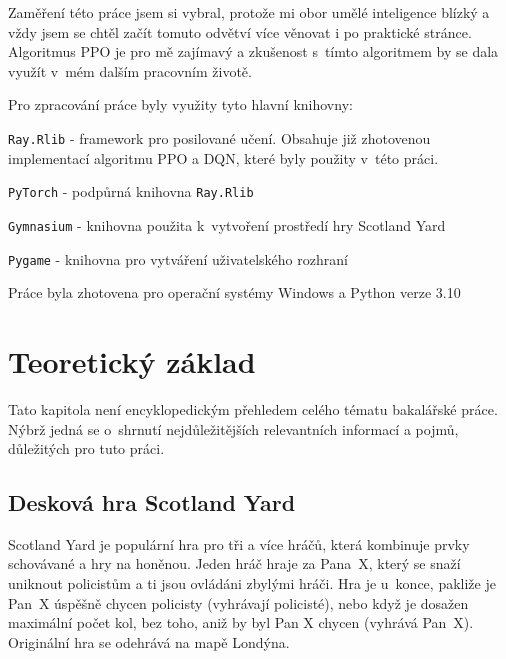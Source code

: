 Zaměření této práce jsem si vybral, protože mi obor umělé inteligence blízký a vždy jsem se chtěl začít tomuto odvětví více věnovat i po praktické stránce.
Algoritmus PPO je pro mě zajímavý a zkušenost s~tímto algoritmem by se dala využít v~mém dalším pracovním životě.\newpage

Pro zpracování práce byly využity tyto hlavní knihovny:
\begin{myitemize}
  \item \texttt{Ray.Rlib} - framework pro posilované učení.
  Obsahuje již zhotovenou implementací algoritmu PPO a DQN, které byly použity v~této práci.

  \item \texttt{PyTorch} - podpůrná knihovna \texttt{Ray.Rlib}
  \item \texttt{Gymnasium} - knihovna použita k~vytvoření prostředí hry Scotland Yard
  \item \texttt{Pygame} - knihovna pro vytváření uživatelského rozhraní
\end{myitemize}

Práce byla zhotovena pro operační systémy Windows a Python verze 3.10

\chapter{Teoretický základ}
\label{ch:teoreticky_zaklad}
Tato kapitola není encyklopedickým přehledem celého tématu bakalářské práce.
Nýbrž jedná se o~shrnutí nejdůležitějších relevantních informací a pojmů, důležitých pro tuto práci.

\section{Desková hra Scotland Yard}
\label{sec:deskova-hra-scotland-yard}

Scotland Yard je populární hra pro tři a více hráčů, která kombinuje prvky schovávané a hry na honěnou.
Jeden hráč hraje za Pana~X, který se snaží uniknout policistům a ti jsou ovládáni zbylými hráči.
Hra je u~konce, pakliže je Pan~X úspěšně chycen policisty (vyhrávají policisté), nebo když je dosažen maximální počet kol, bez toho, aniž by byl Pan X chycen (vyhrává Pan~X).
Originální hra se odehrává na mapě Londýna.

